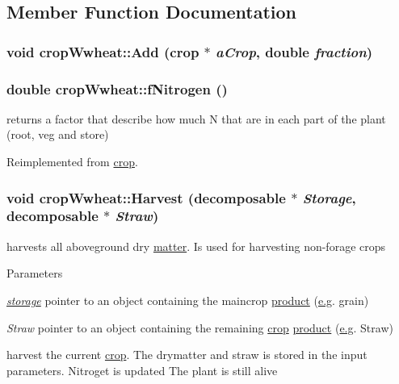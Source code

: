 \subsection{Member Function Documentation}
\hypertarget{classcrop_wwheat_a87f616dcc3aa36a34ac45eef667d6935}{
\subsubsection[{Add}]{\setlength{\rightskip}{0pt plus 5cm}void cropWwheat::Add ({\bf crop} $\ast$ {\em aCrop}, \/  double {\em fraction})}}
\label{classcrop_wwheat_a87f616dcc3aa36a34ac45eef667d6935}
\hypertarget{classcrop_wwheat_aa4c7b3fd03506c8d3ca174bfc31d93e2}{
\subsubsection[{fNitrogen}]{\setlength{\rightskip}{0pt plus 5cm}double cropWwheat::fNitrogen ()}}
\label{classcrop_wwheat_aa4c7b3fd03506c8d3ca174bfc31d93e2}
returns a factor that describe how much N that are in each part of the plant (root, veg and store) 

Reimplemented from \hyperlink{classcrop_a602622ac2c0de6432e6b9438dbbb646b}{crop}.\hypertarget{classcrop_wwheat_a846500070e461386ab5c309a9e6cd388}{
\subsubsection[{Harvest}]{\setlength{\rightskip}{0pt plus 5cm}void cropWwheat::Harvest ({\bf decomposable} $\ast$ {\em Storage}, \/  {\bf decomposable} $\ast$ {\em Straw})}}
\label{classcrop_wwheat_a846500070e461386ab5c309a9e6cd388}


harvests all aboveground dry \hyperlink{classmatter}{matter}. Is used for harvesting non-\/forage crops 
\begin{DoxyParams}{Parameters}
\item[{\em \hyperlink{classstorage}{storage}}]pointer to an object containing the maincrop \hyperlink{classproduct}{product} (\hyperlink{typer_8h_ae4c405e5c68c6ec2c44bb6d6adfc2f6ca35c0bb7088830963c73dcf0470ab8922}{e.g}. grain) \item[{\em Straw}]pointer to an object containing the remaining \hyperlink{classcrop}{crop} \hyperlink{classproduct}{product} (\hyperlink{typer_8h_ae4c405e5c68c6ec2c44bb6d6adfc2f6ca35c0bb7088830963c73dcf0470ab8922}{e.g}. Straw)\end{DoxyParams}
harvest the current \hyperlink{classcrop}{crop}. The drymatter and straw is stored in the input parameters. Nitroget is updated The plant is still alive 

